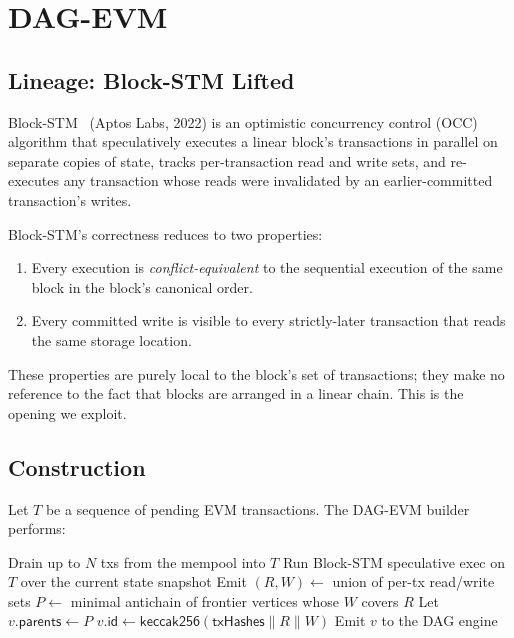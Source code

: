 \section{DAG-EVM}

\label{sec:dagevm}

\subsection{Lineage: Block-STM Lifted}

Block-STM~\cite{blockstm} (Aptos Labs, 2022) is an optimistic concurrency
control (OCC) algorithm that speculatively executes a linear block's
transactions in parallel on separate copies of state, tracks per-transaction
read and write sets, and re-executes any transaction whose reads were
invalidated by an earlier-committed transaction's writes.

Block-STM's correctness reduces to two properties:
\begin{enumerate}
  \item Every execution is \emph{conflict-equivalent} to the sequential
    execution of the same block in the block's canonical order.
  \item Every committed write is visible to every strictly-later transaction
    that reads the same storage location.
\end{enumerate}

These properties are purely local to the block's set of transactions; they
make no reference to the fact that blocks are arranged in a linear chain.
This is the opening we exploit.

\subsection{Construction}

Let $T$ be a sequence of pending EVM transactions. The DAG-EVM builder
performs:

\begin{algorithm}[h]
\caption{BuildVertex (DAG-EVM)}
\begin{algorithmic}[1]
\State Drain up to $N$ txs from the mempool into $T$
\State Run Block-STM speculative exec on $T$ over the current state snapshot
\State Emit $(R, W) \gets$ union of per-tx read/write sets
\State $P \gets$ minimal antichain of frontier vertices whose $W$ covers $R$
\State Let $v.\mathsf{parents} \gets P$
\State $v.\mathsf{id} \gets \mathsf{keccak256}(\mathsf{txHashes} \parallel R \parallel W)$
\State Emit $v$ to the DAG engine
\end{algorithmic}
\end{algorithm}

